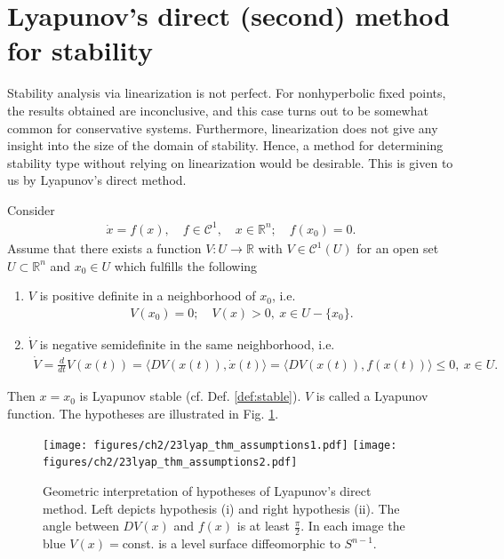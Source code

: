 \section{Lyapunov's direct (second) method for stability}
Stability analysis via linearization is not perfect. For nonhyperbolic fixed points, the results obtained are inconclusive, and this case turns out to be somewhat common for conservative systems. Furthermore, linearization does not give any insight into the size of the domain of stability. Hence, a method for determining stability type without relying on linearization would be desirable. This is given to us by Lyapunov's direct method.

\begin{theorem}[] \label{thm:direct}
	Consider
	\begin{align}
		\dot{x} = f(x), \quad f\in \mathcal{C}^1,\quad x \in \mathbb{R}^{n};\quad f(x_0) = 0.
	\end{align}
	Assume that there exists a function $V:U \to \mathbb{R}$ with $V\in \mathcal{C}^1(U)$ for an open set $U \subset \mathbb{R}^{n}$ and $x_0 \in U$ which fulfills the following
	\begin{enumerate}
		\item $V$ is positive definite in a neighborhood of $x_0$, i.e.
			\begin{align}
				V(x_0)=0;\quad V(x)>0,\ x\in U-\{ x_0 \}.
			\end{align}
		\item $\dot{V}$ is negative semidefinite in the same neighborhood, i.e.
			\begin{align}
				\dot{V} =\frac{d}{dt}V(x(t))= 
				\langle DV(x(t)), \dot{x}(t) \rangle =
				\langle DV(x(t)), f(x(t)) \rangle \leq 0,\ x\in U.
			\end{align}
	\end{enumerate}
	Then $x=x_0$ is Lyapunov stable (cf. Def. \ref{def:stable}). $V$ is called a Lyapunov function. The hypotheses are illustrated in Fig. \ref{fig:lyap_thm_assumptions}.	
\end{theorem}
\begin{figure}[h!]
	\centering
	\texttt{[image: figures/ch2/23lyap\_thm\_assumptions1.pdf]}
	\hspace{0.05\textwidth}
	\texttt{[image: figures/ch2/23lyap\_thm\_assumptions2.pdf]}
	\caption{Geometric interpretation of hypotheses of Lyapunov's direct method. Left depicts hypothesis (i) and right hypothesis (ii). The angle between $DV(x)$ and $f(x)$ is at least $\frac{\pi }{2}$. In each image the blue $V(x)=$const. is a level surface diffeomorphic to $S^{n-1}$.}
	\label{fig:lyap_thm_assumptions}
\end{figure}

